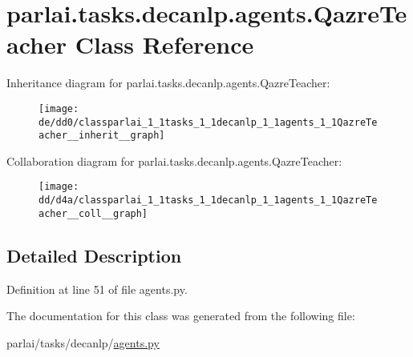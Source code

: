 \hypertarget{classparlai_1_1tasks_1_1decanlp_1_1agents_1_1QazreTeacher}{}\section{parlai.\+tasks.\+decanlp.\+agents.\+Qazre\+Teacher Class Reference}
\label{classparlai_1_1tasks_1_1decanlp_1_1agents_1_1QazreTeacher}


Inheritance diagram for parlai.\+tasks.\+decanlp.\+agents.\+Qazre\+Teacher\+:\nopagebreak
\begin{figure}[H]
\begin{center}
\leavevmode
\texttt{[image: de/dd0/classparlai\_1\_1tasks\_1\_1decanlp\_1\_1agents\_1\_1QazreTeacher\_\_inherit\_\_graph]}
\end{center}
\end{figure}


Collaboration diagram for parlai.\+tasks.\+decanlp.\+agents.\+Qazre\+Teacher\+:\nopagebreak
\begin{figure}[H]
\begin{center}
\leavevmode
\texttt{[image: dd/d4a/classparlai\_1\_1tasks\_1\_1decanlp\_1\_1agents\_1\_1QazreTeacher\_\_coll\_\_graph]}
\end{center}
\end{figure}


\subsection{Detailed Description}


Definition at line 51 of file agents.\+py.



The documentation for this class was generated from the following file\+:\begin{DoxyCompactItemize}
\item 
parlai/tasks/decanlp/\hyperlink{parlai_2tasks_2decanlp_2agents_8py}{agents.\+py}\end{DoxyCompactItemize}
